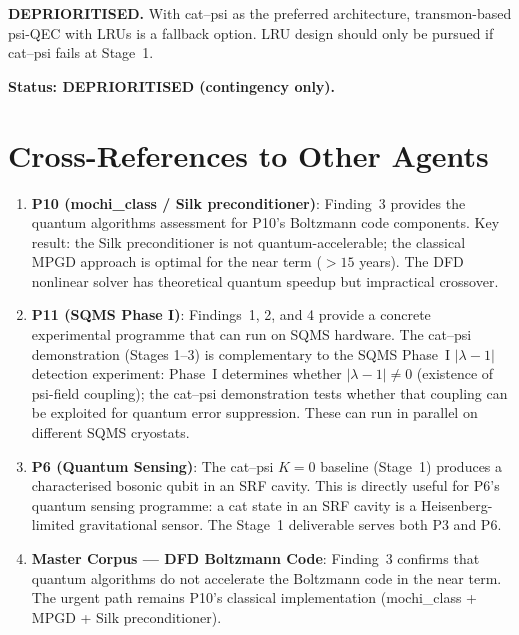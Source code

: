 \documentclass[11pt]{article}
\theoremstyle{definition}
\theoremstyle{remark}
\newcommand{\lamdiff}{|\lambda-1|}
\begin{document}
\textbf{DEPRIORITISED.}  With cat--psi as the preferred architecture,
transmon-based psi-QEC with LRUs is a fallback option.  LRU design
should only be pursued if cat--psi fails at Stage~1.

\textbf{Status: DEPRIORITISED (contingency only).}

\section{Cross-References to Other Agents}
\label{sec:cross-refs}

\begin{enumerate}

\item \textbf{P10 (mochi\_class / Silk preconditioner)}: Finding~3
  provides the quantum algorithms assessment for P10's Boltzmann code
  components.  Key result: the Silk preconditioner is not
  quantum-accelerable; the classical MPGD approach is optimal
  for the near term ($> 15$ years).  The DFD nonlinear solver has
  theoretical quantum speedup but impractical crossover.

\item \textbf{P11 (SQMS Phase I)}: Findings~1, 2, and 4 provide a
  concrete experimental programme that can run on SQMS hardware.  The
  cat--psi demonstration (Stages 1--3) is complementary to the
  SQMS Phase~I $\lamdiff$ detection experiment: Phase~I determines
  whether $\lamdiff \neq 0$ (existence of psi-field coupling); the
  cat--psi demonstration tests whether that coupling can be exploited
  for quantum error suppression.  These can run in parallel on
  different SQMS cryostats.

\item \textbf{P6 (Quantum Sensing)}: The cat--psi $K=0$ baseline
  (Stage~1) produces a characterised bosonic qubit in an SRF cavity.
  This is directly useful for P6's quantum sensing programme: a
  cat state in an SRF cavity is a Heisenberg-limited gravitational
  sensor.  The Stage~1 deliverable serves both P3 and P6.

\item \textbf{Master Corpus --- DFD Boltzmann Code}: Finding~3
  confirms that quantum algorithms do not accelerate the Boltzmann
  code in the near term.  The urgent path remains P10's classical
  implementation (mochi\_class + MPGD + Silk preconditioner).

\end{enumerate}
\end{document}
